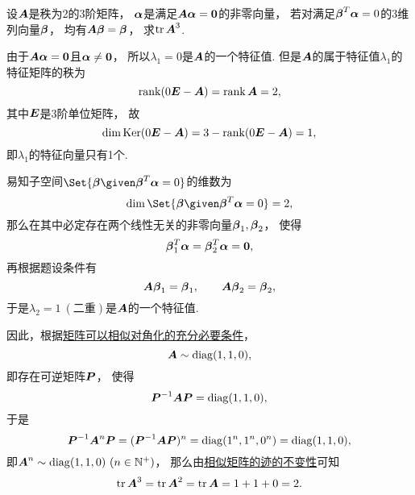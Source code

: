 \begin{example}
设\(\boldsymbol{A}\)是秩为2的3阶矩阵，
\(\boldsymbol\alpha\)是满足\(\boldsymbol{A} \boldsymbol\alpha = \boldsymbol0\)的非零向量，
若对满足\(\boldsymbol\beta^T \boldsymbol\alpha = 0\)的3维列向量\(\boldsymbol\beta\)，
均有\(\boldsymbol{A} \boldsymbol\beta = \boldsymbol\beta\)，
求\(\tr\boldsymbol{A}^3\).
\begin{solution}
由于\(\boldsymbol{A} \boldsymbol\alpha = \boldsymbol0\)且\(\boldsymbol\alpha \neq \boldsymbol0\)，
所以\(\lambda_1 = 0\)是\(\boldsymbol{A}\)的一个特征值.
但是\(\boldsymbol{A}\)的属于特征值\(\lambda_1\)的特征矩阵的秩为\[
	\rank(0\boldsymbol{E}-\boldsymbol{A})
	= \rank\boldsymbol{A}
	= 2,
\]
其中\(\boldsymbol{E}\)是3阶单位矩阵，
故\[
	\dim\operatorname{Ker}(0\boldsymbol{E}-\boldsymbol{A})
	= 3 - \rank(0\boldsymbol{E}-\boldsymbol{A})
	= 1,
\]
即\(\lambda_1\)的特征向量只有1个.

易知子空间\(\Set{\vb\beta \given \vb\beta^T \vb\alpha = 0}\)的维数为\[
	\dim\Set{\vb\beta \given \vb\beta^T \vb\alpha = 0} = 2,
\]
那么在其中必定存在两个线性无关的非零向量\(\boldsymbol\beta_1,\boldsymbol\beta_2\)，
使得\begin{equation*}
	\boldsymbol\beta_1^T \boldsymbol\alpha
	= \boldsymbol\beta_2^T \boldsymbol\alpha
	= \boldsymbol0,
\end{equation*}
再根据题设条件有\[
	\boldsymbol{A}\boldsymbol\beta_1 = \boldsymbol\beta_1,
	\qquad
	\boldsymbol{A}\boldsymbol\beta_2 = \boldsymbol\beta_2,
\]
于是\(\lambda_2 = 1\ (\text{二重})\)是\(\boldsymbol{A}\)的一个特征值.

因此，根据\hyperref[theorem:矩阵相似对角化.矩阵可以相似对角化的充分必要条件]{矩阵可以相似对角化的充分必要条件}，\begin{equation*}
	\boldsymbol{A} \sim \operatorname{diag}(1,1,0),
\end{equation*}
即存在可逆矩阵\(\boldsymbol{P}\)，
使得\[
	\boldsymbol{P}^{-1} \boldsymbol{A} \boldsymbol{P}
	= \operatorname{diag}(1,1,0),
\]
于是\[
	\boldsymbol{P}^{-1} \boldsymbol{A}^n \boldsymbol{P}
	= (\boldsymbol{P}^{-1} \boldsymbol{A} \boldsymbol{P})^n
	= \operatorname{diag}(1^n,1^n,0^n)
	= \operatorname{diag}(1,1,0),
\]
即\(\boldsymbol{A}^n \sim \operatorname{diag}(1,1,0)\ (n\in\mathbb{N}^+)\)，
那么由\hyperref[theorem:特征值与特征向量.相似矩阵的迹的不变性]{相似矩阵的迹的不变性}可知\[
	\tr\boldsymbol{A}^3
	= \tr\boldsymbol{A}^2
	= \tr\boldsymbol{A}
	= 1+1+0
	= 2.
\]
\end{solution}
\end{example}

